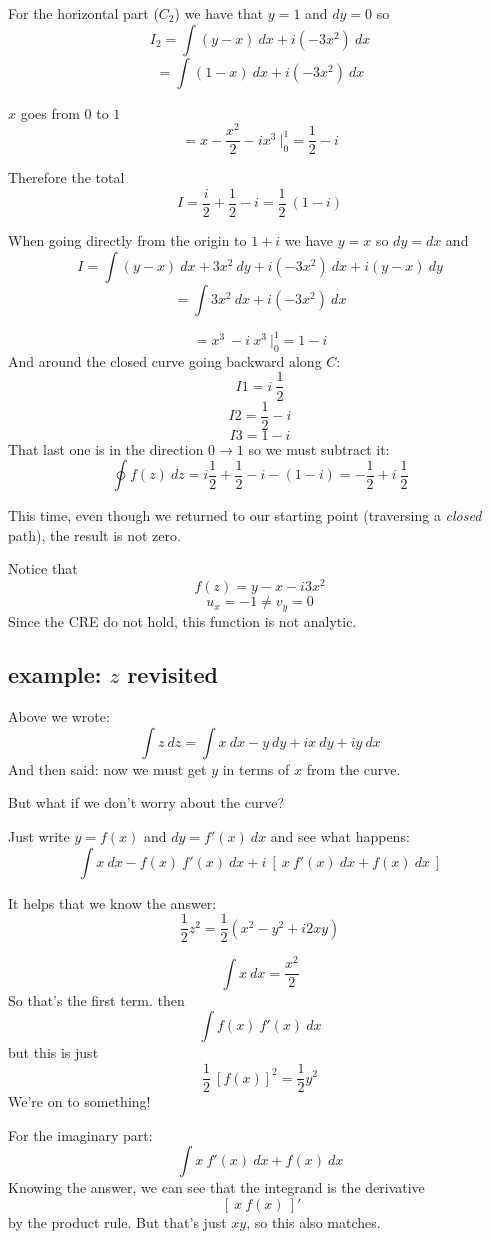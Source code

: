 \documentclass[11pt, oneside]{article}
\begin{document}
For the horizontal part ($C_2$) we have that $y=1$ and $dy = 0$ so
\[ I_2 = \int (y - x) \ dx + i (-3x^2) \ dx  \]
\[ = \int (1 - x) \ dx + i (-3x^2) \ dx \]

$x$ goes from $0$ to $1$
\[ = x - \frac{x^2}{2} - ix^3 \ \bigg |_0^1 = \frac{1}{2} - i \]

Therefore the total
\[ I = \frac{i}{2} + \frac{1}{2} - i = \frac{1}{2} \ (1 - i) \]

When going directly from the origin to $1 + i$ we have $y = x$ so $dy = dx$ and
\[ I = \int (y - x) \ dx + 3x^2 \ dy + i (-3x^2) \ dx + i (y-x) \ dy \]
\[ = \int 3x^2 \ dx + i (-3x^2) \ dx  \]

\[ =  x^3 \  -i  \ x^3 \ \bigg |_0^1  = 1  - i \]
And around the closed curve going backward along $C$:
\[ I1 = i \ \frac{1}{2} \]
\[ I2 = \frac{1}{2} - i \]
\[ I3 = 1 - i \]
That last one is in the direction $0 \rightarrow 1$ so we must subtract it:
\[ \oint f(z) \ dz = i \frac{1}{2} + \frac{1}{2} - i - (1  - i) =  -\frac{1}{2} + i \ \frac{1}{2} \]

This time, even though we returned to our starting point (traversing a \emph{closed} path), the result is not zero.

Notice that
\[ f(z) = y - x - i3x^2 \]
\[ u_x = -1 \ne v_y = 0 \]
Since the CRE do not hold, this function is not analytic.

\subsection*{example: $z$ revisited}
Above we wrote:
\[ \int z \ dz = \int x \ dx - y \ dy + i x \ dy + i y \ dx \]
And then said:  now we must get $y$ in terms of $x$ from the curve.

But what if we don't worry about the curve?  

Just write $y = f(x)$ and $dy = f'(x) \ dx$ and see what happens:
\[ \int x \ dx - f(x) \ f'(x) \ dx + i \ [ \ x \  f'(x) \ dx + f(x) \ dx \ ]  \]

It helps that we know the answer:
\[ \frac{1}{2} z^2 = \frac{1}{2} (x^2 - y^2 + i 2xy) \]

\[ \int x \ dx = \frac{x^2}{2} \]
So that's the first term.  then
\[ \int f(x) \ f'(x) \ dx \]
but this is just
\[ \frac{1}{2} \ [f(x)]^2 = \frac{1}{2} y^2 \]
We're on to something!

For the imaginary part:
\[ \int x \  f'(x) \ dx + f(x) \ dx \]
Knowing the answer, we can see that the integrand is the derivative
\[ \ [ \ x \ f(x) \ ]' \]
by the product rule.  But that's just $xy$, so this also matches. 
\end{document}
